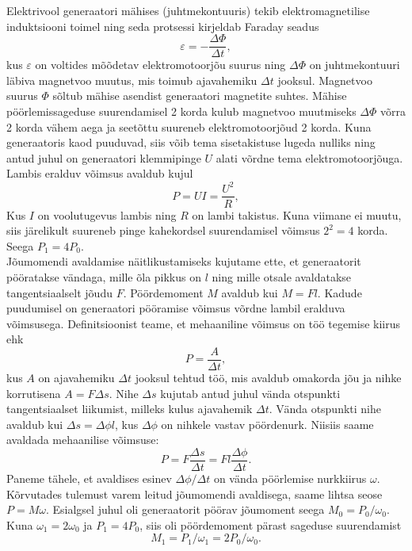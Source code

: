 \solu
\osa Elektrivool generaatori mähises (juhtmekontuuris) tekib elektromagnetilise induktsiooni toimel ning seda protsessi kirjeldab Faraday seadus
$$
\varepsilon = -\frac{\Delta\Phi}{\Delta t},
$$
kus $\varepsilon$ on voltides mõõdetav elektromotoorjõu suurus ning $\Delta\Phi$ on juhtmekontuuri läbiva magnetvoo muutus, mis toimub ajavahemiku $\Delta t$ jooksul. Magnetvoo suurus $\Phi$ sõltub mähise asendist generaatori magnetite suhtes. Mähise pöörlemissageduse suurendamisel 2 korda kulub magnetvoo muutmiseks $\Delta\Phi$ võrra 2 korda vähem aega ja seetõttu suureneb elektromotoorjõud 2 korda. Kuna generaatoris kaod puuduvad, siis võib tema sisetakistuse lugeda nulliks ning antud juhul on generaatori klemmipinge $U$ alati võrdne tema elektromotoorjõuga. Lambis eralduv võimsus avaldub kujul
$$
P = UI = \frac{U^2}{R},
$$
Kus $I$ on voolutugevus lambis ning $R$ on lambi takistus. Kuna viimane ei muutu, siis järelikult suureneb pinge kahekordsel suurendamisel võimsus $2^2=4$ korda. Seega $P_1=4P_0$.\\
\osa Jõumomendi avaldamise näitlikustamiseks kujutame ette, et generaatorit pööratakse vändaga, mille õla pikkus on $l$ ning mille otsale avaldatakse tangentsiaalselt jõudu $F$. Pöördemoment $M$ avaldub kui $M=Fl$. Kadude puudumisel on generaatori pööramise võimsus võrdne lambil eralduva võimsusega. Definitsioonist teame, et mehaaniline võimsus on töö tegemise kiirus ehk
$$
P = \frac{A}{\Delta t},
$$
kus $A$ on ajavahemiku $\Delta t$ jooksul tehtud töö, mis avaldub omakorda jõu ja nihke korrutisena $A=F \Delta s$. Nihe $\Delta s$ kujutab antud juhul vända otspunkti tangentsiaalset liikumist, milleks kulus ajavahemik $\Delta t$. Vända otspunkti nihe avaldub kui $\Delta s=\Delta\phi l$, kus $\Delta\phi$ on nihkele vastav pöördenurk. Niisiis saame avaldada mehaanilise võimsuse:
$$
P = F \frac{\Delta s}{\Delta t} =Fl \frac{\Delta\phi}{\Delta t}.
$$
Paneme tähele, et avaldises esinev $\Delta\phi / \Delta t$ on vända pöörlemise nurkkiirus $\omega$. Kõrvutades tulemust varem leitud jõumomendi avaldisega, saame lihtsa seose $P=M\omega$. Esialgsel juhul oli generaatorit pöörav jõumoment seega
$M_0 = P_0/\omega_0$. Kuna $\omega_1=2\omega_0$ ja $P_1=4P_0$, siis oli pöördemoment pärast sageduse suurendamist
\[
M_1 = P_1/\omega_1=2P_0/\omega_0.
\]

